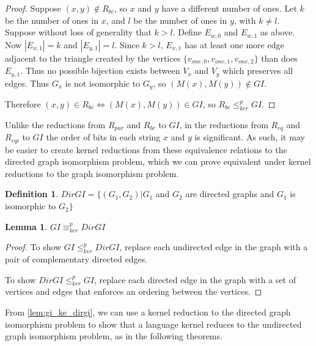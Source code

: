 \documentclass{article}
\newtheorem{lemma}{Lemma}%
\theoremstyle{definition}
\newtheorem{definition}{Definition}%
\newcommand{\kr}{\leq^{p}_{ker}} %
\newcommand{\kequiv}{\equiv^{p}_{ker}} %
\begin{document}
\begin{proof}
  Suppose $(x, y)\notin R_{bc}$, so $x$ and $y$ have a different number of
  ones. Let $k$ be the number of ones in $x$, and $l$ be the number of ones in
  $y$, with $k\neq l$. Suppose without loss of generality that $k>l$. Define
  $E_{w,0}$ and $E_{w,1}$ as above. Now $|E_{x,1}|=k$ and $|E_{y,1}|=l$. Since
  $k>l$, $E_{x,1}$ has at least one more edge adjacent to the triangle created
  by the vertices $\{v_{one,0},v_{one,1},v_{one,2}\}$ than does $E_{y,1}$. Thus
  no possible bijection exists between $V_x$ and $V_y$ which preserves all
  edges. Thus $G_x$ is not isomorphic to $G_y$, so $(M(x), M(y))\notin GI$.

  Therefore $(x, y)\in R_{bc} \iff (M(x), M(y))\in GI$, so $R_{bc}\kr GI$.
\end{proof}

Unlike the reductions from $R_{par}$ and $R_{bc}$ to $GI$, in the reductions
from $R_{eq}$ and $R_{eqi}$ to $GI$ the order of bits in each string $x$ and
$y$ is significant. As such, it may be easier to create kernel reductions from
these equivalence relations to the directed graph isomorphism problem, which we
can prove equivalent under kernel reductions to the graph isomorphism problem.

\begin{definition}
  $DirGI=\{(G_1, G_2)|G_1$ and $G_2$ are directed graphs and $G_1$ is
  isomorphic to $G_2\}$
\end{definition}

\begin{lemma}\label{lem:gi_ke_dirgi}$GI\kequiv DirGI$\end{lemma}
\begin{proof}
  To show $GI\kr DirGI$, replace each undirected edge in the graph with a pair
  of complementary directed edges.
  
  To show $DirGI\kr GI$, replace each directed edge in the graph with a set of
  vertices and edges that enforces an ordering between the vertices.
\end{proof}

From \autoref{lem:gi_ke_dirgi}, we can use a kernel reduction to the directed
graph isomorphism problem to show that a language kernel reduces to the
undirected graph isomorphism problem, as in the following theorems.
\end{document}
